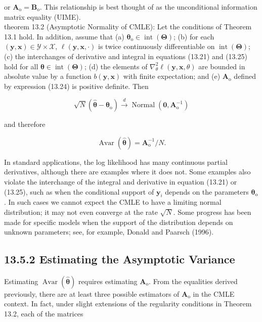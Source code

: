 \documentclass[10pt]{article}
\begin{document}
or $\mathbf{A}_{\mathrm{o}}=\mathbf{B}_{\mathrm{o}}$. This relationship is best thought of as the unconditional information matrix equality (UIME).\\
theorem 13.2 (Asymptotic Normality of CMLE): Let the conditions of Theorem 13.1 hold. In addition, assume that (a) $\boldsymbol{\theta}_{\mathrm{o}} \in \operatorname{int}(\boldsymbol{\Theta})$; (b) for each $(\mathbf{y}, \mathbf{x}) \in \mathscr{Y} \times \mathscr{X}$, $\ell(\mathbf{y}, \mathbf{x}, \cdot)$ is twice continuously differentiable on $\operatorname{int}(\boldsymbol{\Theta})$; (c) the interchanges of derivative and integral in equations (13.21) and (13.25) hold for all $\boldsymbol{\theta} \in \operatorname{int}(\boldsymbol{\Theta})$; (d) the elements of $\nabla_{\theta}^{2} \ell(\mathbf{y}, \mathbf{x}, \theta)$ are bounded in absolute value by a function $b(\mathbf{y}, \mathbf{x})$ with finite expectation; and (e) $\mathbf{A}_{\mathrm{o}}$ defined by expression (13.24) is positive definite. Then


\begin{equation*}
\sqrt{N}\left(\hat{\boldsymbol{\theta}}-\boldsymbol{\theta}_{\mathrm{o}}\right) \xrightarrow{d} \operatorname{Normal}\left(\mathbf{0}, \mathbf{A}_{\mathrm{o}}^{-1}\right) \tag{13.28}
\end{equation*}


and therefore


\begin{equation*}
\operatorname{Avar}(\hat{\boldsymbol{\theta}})=\mathbf{A}_{\mathrm{o}}^{-1} / N . \tag{13.29}
\end{equation*}


In standard applications, the log likelihood has many continuous partial derivatives, although there are examples where it does not. Some examples also violate the interchange of the integral and derivative in equation (13.21) or (13.25), such as when the conditional support of $\mathbf{y}_{i}$ depends on the parameters $\boldsymbol{\theta}_{\mathrm{o}}$. In such cases we cannot expect the CMLE to have a limiting normal distribution; it may not even converge at the rate $\sqrt{N}$. Some progress has been made for specific models when the support of the distribution depends on unknown parameters; see, for example, Donald and Paarsch (1996).

\subsection*{13.5.2 Estimating the Asymptotic Variance}
Estimating $\operatorname{Avar}(\hat{\boldsymbol{\theta}})$ requires estimating $\mathbf{A}_{\mathrm{o}}$. From the equalities derived previously, there are at least three possible estimators of $\mathbf{A}_{\mathrm{o}}$ in the CMLE context. In fact, under slight extensions of the regularity conditions in Theorem 13.2, each of the matrices
\end{document}
